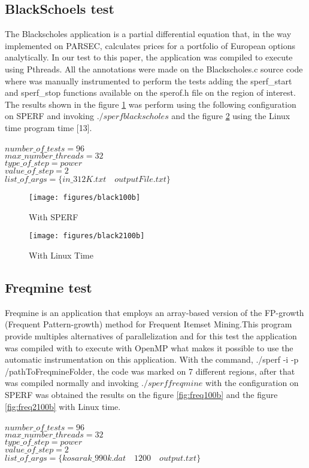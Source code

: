 \documentclass[sigconf]{acmart}
\begin{document}
\subsection{BlackSchoels test}
The Blackscholes application is a partial differential equation that, in the way implemented on PARSEC, calculates prices for a portfolio of European options analytically. In our test to this paper, the application was compiled to execute using Pthreads. All the annotations were made on the Blackscholes.c source code where was manually instrumented to perform the tests adding the sperf\_start and sperf\_stop functions available on the sperof.h file on the region of interest. The results shown in the figure \ref{fig:black100b} was perform using the following configuration on SPERF and invoking $./sperf blackscholes$ and the figure \ref{fig:black2100b} using the Linux time program time [13].
\\
\\
$number\_of\_tests=96$\\
$max\_number\_threads=32$\\
$type\_of\_step=power$\\
$value\_of\_step=2$\\
$list\_of\_args=\{in\_312K.txt \quad outputFile.txt\}$

\begin{figure}[H]
	\texttt{[image: figures/black100b]}
	\caption{With SPERF}
	\label{fig:black100b}
\end{figure}

\begin{figure}[H]
  \texttt{[image: figures/black2100b]}
  \caption{With Linux Time}
  \label{fig:black2100b}
\end{figure}

\subsection{Freqmine test}
Freqmine is an application that employs an array-based version of the FP-growth (Frequent Pattern-growth) method for Frequent Itemset Mining.This program provide multiples alternatives of parallelization and for this test the application was compiled with to execute with OpenMP what makes it possible to use the automatic instrumentation on this application. With the command, ./sperf -i -p /pathToFreqmineFolder, the code was marked on 7 different regions, after that was compiled normally and invoking $./sperf freqmine$ with the configuration on SPERF was obtained the results on the figure \ref{fig:freq100b} and the figure \ref{fig:freq2100b} with Linux time.
\\
\\
$number\_of\_tests=96$\\
$max\_number\_threads=32$\\
$type\_of\_step=power$\\
$value\_of\_step=2$\\
$list\_of\_args=\{kosarak\_990k.dat \quad 1200 \quad output.txt\}$
\end{document}
